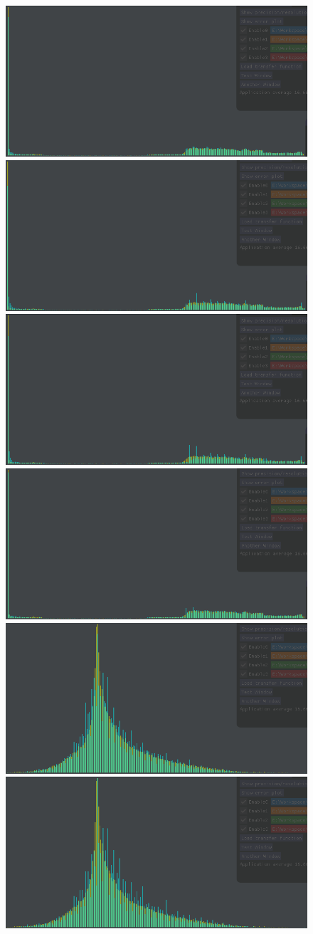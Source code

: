 \begin{figure}
	\centering
	{\includegraphics[width=0.48\linewidth]{img/histogram/kflame/histogram.png}}
	{\includegraphics[width=0.48\linewidth]{img/histogram/kflame/rmse.png}}
	{\includegraphics[width=0.48\linewidth]{img/histogram/kflame/wavenorm.png}}
	{\includegraphics[width=0.48\linewidth]{img/histogram/kflame/signature.png}}
	{\includegraphics[width=0.48\linewidth]{img/histogram/diffusivity/histogram.png}}
	{\includegraphics[width=0.48\linewidth]{img/histogram/diffusivity/rmse.png}}

\end{figure}
